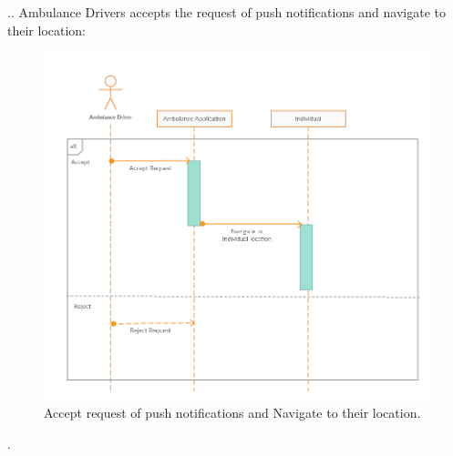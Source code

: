 .\newline\newline\newline\newline\newline\newline\newline\newline\newline\newline\newline\newline{}. Ambulance Drivers accepts the request of push notifications and navigate to their location:
\begin{figure}[H]
	\begin{center}
		\includegraphics[width=\textwidth]{./RASD_Sequence/5_AmbulanceDriver.png}
      	\caption{Accept request of push notifications and Navigate to their location.}
        \label{TrackMe_seq5}
	\end{center}
\end{figure}
.\newline\newline\newline\newline\newline\newline\newline\newline\newline
